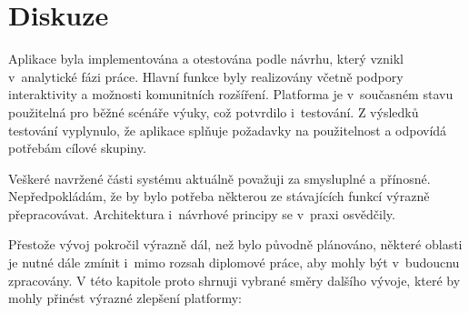 \chapter{Diskuze}\label{text:diskuze}

Aplikace byla implementována a otestována podle návrhu, který vznikl v~analytické fázi práce.
Hlavní funkce byly realizovány včetně podpory interaktivity a možnosti komunitních rozšíření.
Platforma je v~současném stavu použitelná pro běžné scénáře výuky, což potvrdilo i~testování.
Z výsledků testování vyplynulo, že aplikace splňuje požadavky na použitelnost a odpovídá potřebám cílové skupiny.

Veškeré navržené části systému aktuálně považuji za smysluplné a přínosné. 
Nepředpokládám, že by bylo potřeba některou ze stávajících funkcí výrazně přepracovávat. 
Architektura i~návrhové principy se v~praxi osvědčily.

Přestože vývoj pokročil výrazně dál, než bylo původně plánováno, některé oblasti je nutné dále zmínit i~mimo rozsah diplomové práce, aby mohly být v~budoucnu zpracovány. 
V této kapitole proto shrnuji vybrané směry dalšího vývoje, které by mohly přinést výrazné zlepšení platformy:

